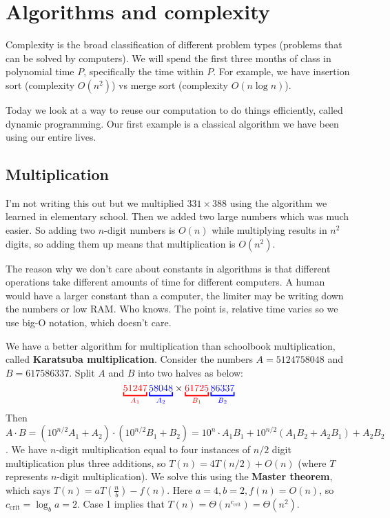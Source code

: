 \section{Algorithms and complexity}
Complexity is the broad classification of different problem types (problems that can be solved by computers). We will spend the first three months of class in polynomial time $P$, specifically the time within $P$. For example, we have insertion sort (complexity $O(n^2)$) vs merge sort (complexity $O( n \log n)$).

Today we look at a way to reuse our computation to do things efficiently, called dynamic programming. Our first example is a classical algorithm we have been using our entire lives.

\subsection{Multiplication}
I'm not writing this out but we multiplied $331 \times 388$ using the algorithm we learned in elementary school. Then we added two large numbers which was much easier. So adding two $n$-digit numbers is $O(n)$ while multiplying results in $n^2$ digits, so adding them up means that multiplication is $O(n^2)$.

The reason why we don't care about constants in algorithms is that different operations take different amounts of time for different computers. A human would have a larger constant than a computer, the limiter may be writing down the numbers or low RAM. Who knows. The point is, relative time varies so we use big-O notation, which doesn't care.

We have a better algorithm for multiplication than schoolbook multiplication, called \textbf{Karatsuba multiplication}. Consider the numbers $A=5124758048$ and $B=617586337$. Split $A$ and $B$ into two halves as below: \[
{\color{red}\underset{A_1}{\underbracket{51247}}}  \, {\color{blue}\underset{A_2}{\underbracket{58048}}}   \times 
{\color{red}\underset{B_1}{\underbracket{61725}}}  \, {\color{blue}\underset{B_2}{\underbracket{86337}}}   
\] Then $A\cdot B=(10 ^{n /2}A_1+A_2)\cdot (10^{n /2}B_1+B_2)=10^n \cdot A_1B_1+10^{n /2}(A_1B_2+A_2B_1)+A_2B_2$. We have $n$-digit multiplication equal to four instances of $n /2$ digit multiplication plus three additions, so $T(n)=4 T(n /2)+O(n)$ (where $T$ represents $n$-digit multiplication). We solve this using the \textbf{Master theorem}, which says $T(n)=a T\left(\frac{n}{b}\right)-f(n)$. Here $a=4,b=2, f(n)=O(n)$, so $c _{\mathrm{crit}}=\log_ba=2$. Case 1 implies that $T(n)= \Theta (n^{c_{ \mathrm{crit}}})=\Theta(n^2)$.

